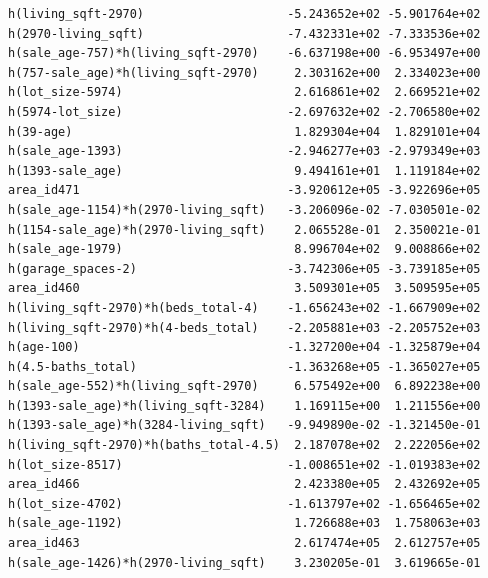 \documentclass[
]{article}
\begin{document}
\begin{verbatim}
h(living_sqft-2970)                    -5.243652e+02 -5.901764e+02
h(2970-living_sqft)                    -7.432331e+02 -7.333536e+02
h(sale_age-757)*h(living_sqft-2970)    -6.637198e+00 -6.953497e+00
h(757-sale_age)*h(living_sqft-2970)     2.303162e+00  2.334023e+00
h(lot_size-5974)                        2.616861e+02  2.669521e+02
h(5974-lot_size)                       -2.697632e+02 -2.706580e+02
h(39-age)                               1.829304e+04  1.829101e+04
h(sale_age-1393)                       -2.946277e+03 -2.979349e+03
h(1393-sale_age)                        9.494161e+01  1.119184e+02
area_id471                             -3.920612e+05 -3.922696e+05
h(sale_age-1154)*h(2970-living_sqft)   -3.206096e-02 -7.030501e-02
h(1154-sale_age)*h(2970-living_sqft)    2.065528e-01  2.350021e-01
h(sale_age-1979)                        8.996704e+02  9.008866e+02
h(garage_spaces-2)                     -3.742306e+05 -3.739185e+05
area_id460                              3.509301e+05  3.509595e+05
h(living_sqft-2970)*h(beds_total-4)    -1.656243e+02 -1.667909e+02
h(living_sqft-2970)*h(4-beds_total)    -2.205881e+03 -2.205752e+03
h(age-100)                             -1.327200e+04 -1.325879e+04
h(4.5-baths_total)                     -1.363268e+05 -1.365027e+05
h(sale_age-552)*h(living_sqft-2970)     6.575492e+00  6.892238e+00
h(1393-sale_age)*h(living_sqft-3284)    1.169115e+00  1.211556e+00
h(1393-sale_age)*h(3284-living_sqft)   -9.949890e-02 -1.321450e-01
h(living_sqft-2970)*h(baths_total-4.5)  2.187078e+02  2.222056e+02
h(lot_size-8517)                       -1.008651e+02 -1.019383e+02
area_id466                              2.423380e+05  2.432692e+05
h(lot_size-4702)                       -1.613797e+02 -1.656465e+02
h(sale_age-1192)                        1.726688e+03  1.758063e+03
area_id463                              2.617474e+05  2.612757e+05
h(sale_age-1426)*h(2970-living_sqft)    3.230205e-01  3.619665e-01
                                                                  

\end{verbatim}
\end{document}
